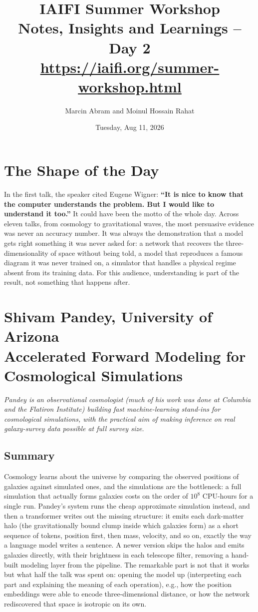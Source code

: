 \documentclass[11pt]{article}
\title{IAIFI Summer Workshop\\[12pt]
\large{Notes, Insights and Learnings -- Day 2}\\[3pt]
\large{\url{https://iaifi.org/summer-workshop.html}}}
\author{Marcin Abram and Moinul Hossain Rahat}
\date{Tuesday, Aug 11, 2026}
\begin{document}
\maketitle

\section*{The Shape of the Day}

In the first talk, the speaker cited Eugene Wigner: \textbf{``It is nice to know that the computer understands the problem. But I would like to understand it too.''} It could have been the motto of the whole day. Across eleven talks, from cosmology to gravitational waves, the most persuasive evidence was never an accuracy number. It was always the demonstration that a model gets right something it was never asked for: a network that recovers the three-dimensionality of space without being told, a model that reproduces a famous diagram it was never trained on, a simulator that handles a physical regime absent from its training data. For this audience, understanding is part of the result, not something that happens after.

\section{Shivam Pandey, University of Arizona\\
{\large Accelerated Forward Modeling for Cosmological Simulations}}

\emph{Pandey is an observational cosmologist (much of his work was done at Columbia and the Flatiron Institute) building fast machine-learning stand-ins for cosmological simulations, with the practical aim of making inference on real galaxy-survey data possible at full survey size.}

\subsection*{Summary}
Cosmology learns about the universe by comparing the observed positions of galaxies against simulated ones, and the simulations are the bottleneck: a full simulation that actually forms galaxies costs on the order of $10^8$ CPU-hours for a single run. Pandey's system runs the cheap approximate simulation instead, and then a transformer writes out the missing structure: it emits each dark-matter halo (the gravitationally bound clump inside which galaxies form) as a short sequence of tokens, position first, then mass, velocity, and so on, exactly the way a language model writes a sentence. A newer version skips the halos and emits galaxies directly, with their brightness in each telescope filter, removing a hand-built modeling layer from the pipeline. The remarkable part is not that it works but what half the talk was spent on: opening the model up (interpreting each part and explaining the meaning of each operation), e.g., how the position embeddings were able to encode three-dimensional distance, or how the network rediscovered that space is isotropic on its own.
\end{document}
